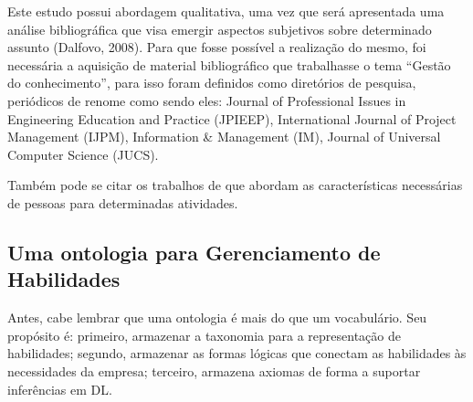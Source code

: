 \documentclass[hyphens,11pt,a4paper]{article}
\begin{document}
Este estudo possui abordagem qualitativa, uma vez que será apresentada uma análise bibliográfica que visa emergir aspectos subjetivos sobre determinado assunto (Dalfovo, 2008). Para que fosse possível a realização do mesmo, foi necessária a aquisição de material bibliográfico que trabalhasse o tema “Gestão do conhecimento”, para isso foram definidos como diretórios de pesquisa, periódicos de renome como sendo eles: Journal of Professional Issues in Engineering Education and Practice (JPIEEP), International Journal of Project Management (IJPM), Information \& Management (IM), Journal of Universal Computer Science (JUCS).  

Também pode se citar os trabalhos de \cite{wu2004}   \cite{pant2008} \cite{Carbone2004}  que abordam as características necessárias de pessoas para determinadas atividades.

\subsection{Uma ontologia para Gerenciamento de Habilidades}

Antes, cabe lembrar que uma ontologia é mais do que um vocabulário. Seu propósito é: primeiro, armazenar a taxonomia para a representação de habilidades; segundo, armazenar as formas lógicas que conectam as habilidades às necessidades da empresa; terceiro, armazena axiomas de forma a suportar inferências em DL.
\end{document}
